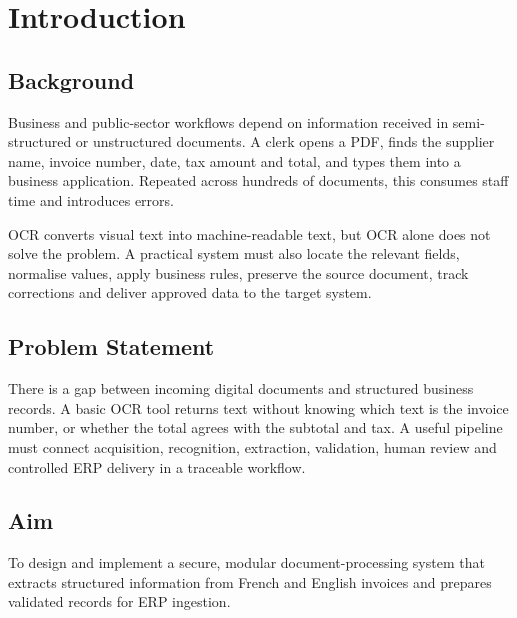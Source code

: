 \chapter{Introduction}
\section{Background}
Business and public-sector workflows depend on information received in semi-structured or unstructured documents. A clerk opens a PDF, finds the supplier name, invoice number, date, tax amount and total, and types them into a business application. Repeated across hundreds of documents, this consumes staff time and introduces errors.

OCR converts visual text into machine-readable text, but OCR alone does not solve the problem. A practical system must also locate the relevant fields, normalise values, apply business rules, preserve the source document, track corrections and deliver approved data to the target system.

\section{Problem Statement}
There is a gap between incoming digital documents and structured business records. A basic OCR tool returns text without knowing which text is the invoice number, or whether the total agrees with the subtotal and tax. A useful pipeline must connect acquisition, recognition, extraction, validation, human review and controlled ERP delivery in a traceable workflow.

\section{Aim}
To design and implement a secure, modular document-processing system that extracts structured information from French and English invoices and prepares validated records for ERP ingestion.

